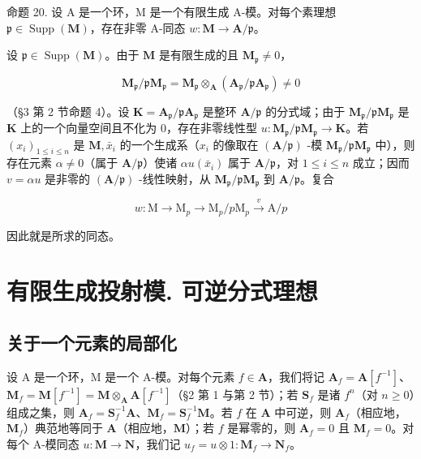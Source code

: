 命题 20. 设 A 是一个环，M 是一个有限生成 A-模。对每个素理想 \(\mathfrak{p} \in \operatorname{Supp}(\mathbf{M})\)，存在非零 A-同态 \(w: \mathbf{M} \to \mathbf{A}/\mathfrak{p}\)。

设 \(\mathfrak{p} \in \operatorname{Supp}(\mathbf{M})\)。由于 \(\mathbf{M}\) 是有限生成的且 \(\mathbf{M}_{\mathfrak{p}} \neq 0\)，

\[
\mathbf {M} _ {\mathfrak {p}} / \mathfrak {p} \mathbf {M} _ {\mathfrak {p}} = \mathbf {M} _ {\mathfrak {p}} \otimes_ {\mathbf {A}} (\mathbf {A} _ {\mathfrak {p}} / \mathfrak {p} \mathbf {A} _ {\mathfrak {p}}) \neq 0
\]

（§3 第 2 节命题 4）。设 \(\mathbf{K} = \mathbf{A}_{\mathfrak{p}} / \mathfrak{p}\mathbf{A}_{\mathfrak{p}}\) 是整环 \(\mathbf{A} / \mathfrak{p}\) 的分式域；由于 \(\mathbf{M}_{\mathfrak{p}} / \mathfrak{p}\mathbf{M}_{\mathfrak{p}}\) 是 \(\mathbf{K}\) 上的一个向量空间且不化为 0，存在非零线性型 \(u: \mathbf{M}_{\mathfrak{p}} / \mathfrak{p}\mathbf{M}_{\mathfrak{p}} \to \mathbf{K}\)。若 \((x_{i})_{1 \leqslant i \leqslant n}\) 是 \(\mathbf{M}, \bar{x}_{i}\) 的一个生成系（\(x_{i}\) 的像取在 \((\mathbf{A} / \mathfrak{p})\) -模 \(\mathbf{M}_{\mathfrak{p}} / \mathfrak{p}\mathbf{M}_{\mathfrak{p}}\) 中），则存在元素 \(\alpha \neq 0\)（属于 \(\mathbf{A} / \mathfrak{p}\)）使诸 \(\alpha u(\bar{x}_i)\) 属于 \(\mathbf{A} / \mathfrak{p}\)，对 \(1 \leqslant i \leqslant n\) 成立；因而 \(v = \alpha u\) 是非零的 \((\mathbf{A} / \mathfrak{p})\) -线性映射，从 \(\mathbf{M}_{\mathfrak{p}} / \mathfrak{p}\mathbf{M}_{\mathfrak{p}}\) 到 \(\mathbf{A} / \mathfrak{p}\)。复合

\[
w: \mathrm{M} \longrightarrow \mathrm{M} _ {p} \longrightarrow \mathrm{M} _ {p} / p \mathrm{M} _ {p} \stackrel {v} {\longrightarrow} \mathrm{A} / p
\]

因此就是所求的同态。

\section{有限生成投射模. 可逆分式理想}

\subsection{关于一个元素的局部化}

设 A 是一个环，M 是一个 A-模。对每个元素 \(f \in \mathbf{A}\)，我们将记 \(\mathbf{A}_f = \mathbf{A}[f^{-1}]\)、\(\mathbf{M}_f = \mathbf{M}[f^{-1}] = \mathbf{M} \otimes_{\mathbf{A}} \mathbf{A}[f^{-1}]\)（§2 第 1 与第 2 节）；若 \(\mathbf{S}_f\) 是诸 \(f^n\)（对 \(n \geqslant 0\)）组成之集，则 \(\mathbf{A}_f = \mathbf{S}_f^{-1}\mathbf{A}\)、\(\mathbf{M}_f = \mathbf{S}_f^{-1}\mathbf{M}\)。若 \(f\) 在 \(\mathbf{A}\) 中可逆，则 \(\mathbf{A}_f\)（相应地，\(\mathbf{M}_f\)）典范地等同于 \(\mathbf{A}\)（相应地，\(\mathbf{M}\)）；若 \(f\) 是幂零的，则 \(\mathbf{A}_f = 0\) 且 \(\mathbf{M}_f = 0\)。对每个 A-模同态 \(u: \mathbf{M} \to \mathbf{N}\)，我们记 \(u_f = u \otimes 1: \mathbf{M}_f \to \mathbf{N}_f\)。

